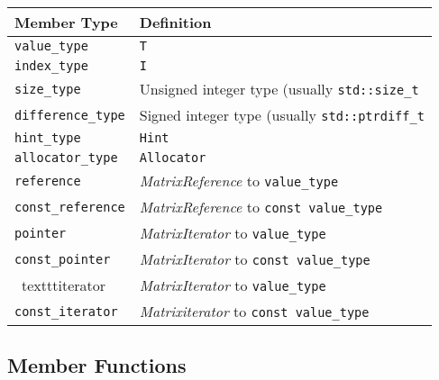 \begin{tabularx}{\textwidth}{l X}
\textbf{Member Type} & \textbf{Definition}\\
\hline
\texttt{value\_type} & \texttt{T} \\
\hline
\texttt{index\_type} & \texttt{I} \\
\hline
\texttt{size\_type} & Unsigned integer type (usually \texttt{std::size\_t}\\
\hline
\texttt{difference\_type} & Signed integer type (usually \texttt{std::ptrdiff\_t}\\
\hline
\texttt{hint\_type} & \texttt{Hint}\\
\hline
\texttt{allocator\_type} & \texttt{Allocator}\\
\hline
\texttt{reference} & \textit{MatrixReference} to \texttt{value\_type}\\
\hline
\texttt{const\_reference} & \textit{MatrixReference} to \texttt{const value\_type}\\
\hline
\texttt{pointer} & \textit{MatrixIterator} to \texttt{value\_type}\\
\hline
\texttt{const\_pointer} & \textit{MatrixIterator} to \texttt{const value\_type}\\
\hline\
texttt{iterator} & \textit{MatrixIterator} to \texttt{value\_type}\\
\hline
\texttt{const\_iterator} & \textit{Matrixiterator} to \texttt{const value\_type}\\
\end{tabularx}

\subsection{Member Functions}

